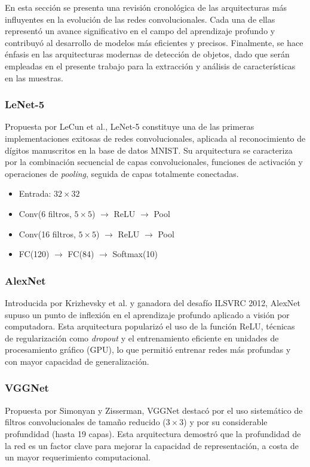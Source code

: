 En esta sección se presenta una revisión cronológica de las arquitecturas más influyentes en la evolución de las redes convolucionales. Cada una de ellas representó un avance significativo en el campo del aprendizaje profundo y contribuyó al desarrollo de modelos más eficientes y precisos. Finalmente, se hace énfasis en las arquitecturas modernas de detección de objetos, dado que serán empleadas en el presente trabajo para la extracción y análisis de características en las muestras.  

\subsubsection{LeNet-5}  
Propuesta por LeCun et al., LeNet-5 constituye una de las primeras implementaciones exitosas de redes convolucionales, aplicada al reconocimiento de dígitos manuscritos en la base de datos MNIST. Su arquitectura se caracteriza por la combinación secuencial de capas convolucionales, funciones de activación y operaciones de \textit{pooling}, seguida de capas totalmente conectadas.  

\begin{itemize}
    \item Entrada: $32 \times 32$
    \item Conv(6 filtros, $5 \times 5$) $\rightarrow$ ReLU $\rightarrow$ Pool
    \item Conv(16 filtros, $5 \times 5$) $\rightarrow$ ReLU $\rightarrow$ Pool
    \item FC(120) $\rightarrow$ FC(84) $\rightarrow$ Softmax(10)
\end{itemize}

\subsubsection{AlexNet}  
Introducida por Krizhevsky et al. y ganadora del desafío ILSVRC 2012, AlexNet supuso un punto de inflexión en el aprendizaje profundo aplicado a visión por computadora. Esta arquitectura popularizó el uso de la función ReLU, técnicas de regularización como \textit{dropout} y el entrenamiento eficiente en unidades de procesamiento gráfico (GPU), lo que permitió entrenar redes más profundas y con mayor capacidad de generalización.  

\subsubsection{VGGNet}  
Propuesta por Simonyan y Zisserman, VGGNet destacó por el uso sistemático de filtros convolucionales de tamaño reducido ($3 \times 3$) y por su considerable profundidad (hasta 19 capas). Esta arquitectura demostró que la profundidad de la red es un factor clave para mejorar la capacidad de representación, a costa de un mayor requerimiento computacional.  

